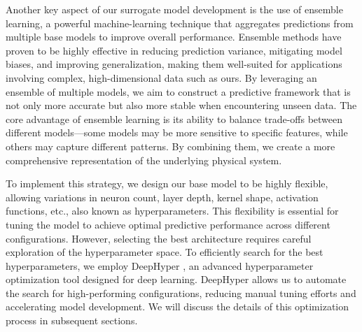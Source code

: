 \documentclass{jpp}
\begin{document}
Another key aspect of our surrogate model development is the use of ensemble learning, a powerful machine-learning technique that aggregates predictions from multiple base models to improve overall performance. Ensemble methods have proven to be highly effective in reducing prediction variance, mitigating model biases, and improving generalization, making them well-suited for applications involving complex, high-dimensional data such as ours.
By leveraging an ensemble of multiple models, we aim to construct a predictive framework that is not only more accurate but also more stable when encountering unseen data. The core advantage of ensemble learning is its ability to balance trade-offs between different models—some models may be more sensitive to specific features, while others may capture different patterns. By combining them, we create a more comprehensive representation of the underlying physical system.

To implement this strategy, we design our base model to be highly flexible, allowing variations in neuron count, layer depth, kernel shape, activation functions, etc., also known as hyperparameters. This flexibility is essential for tuning the model to achieve optimal predictive performance across different configurations. However, selecting the best architecture requires careful exploration of the hyperparameter space.
To efficiently search for the best hyperparameters, we employ DeepHyper \citep{balaprakash2018deephyper, egele2023asynchronous}, an advanced hyperparameter optimization tool designed for deep learning. DeepHyper allows us to automate the search for high-performing  configurations, reducing manual tuning efforts and accelerating model development. We will discuss the details of this optimization process in subsequent sections.
\end{document}
